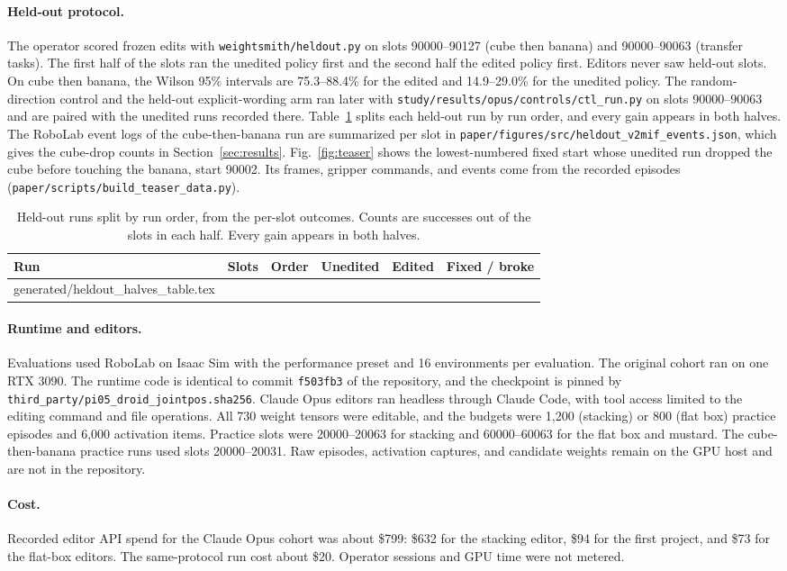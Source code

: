 \documentclass{article}
\makeatletter
\newcommand{\tabinput}[1]{\@@input #1 }
\makeatother
\begin{document}
\paragraph{Held-out protocol.} The operator scored frozen edits with \texttt{weightsmith/heldout.py} on slots 90000--90127 (cube then banana) and 90000--90063 (transfer tasks). The first half of the slots ran the unedited policy first and the second half the edited policy first. Editors never saw held-out slots. On cube then banana, the Wilson 95\% intervals are 75.3--88.4\% for the edited and 14.9--29.0\% for the unedited policy. The random-direction control and the held-out explicit-wording arm ran later with \texttt{study/results/opus/controls/ctl\_run.py} on slots 90000--90063 and are paired with the unedited runs recorded there. Table~\ref{tab:halves} splits each held-out run by run order, and every gain appears in both halves. The RoboLab event logs of the cube-then-banana run are summarized per slot in \texttt{paper/figures/src/heldout\_v2mif\_events.json}, which gives the cube-drop counts in Section~\ref{sec:results}. Fig.~\ref{fig:teaser} shows the lowest-numbered fixed start whose unedited run dropped the cube before touching the banana, start 90002. Its frames, gripper commands, and events come from the recorded episodes (\texttt{paper/scripts/build\_teaser\_data.py}).

\begin{table}[htbp]
\centering\small
\caption{Held-out runs split by run order, from the per-slot outcomes. Counts are successes out of the slots in each half. Every gain appears in both halves.}
\label{tab:halves}
\begin{tabular}{@{}llllll@{}}
\toprule
Run & Slots & Order & Unedited & Edited & Fixed / broke\\
\midrule
\tabinput{generated/heldout_halves_table.tex}
\bottomrule
\end{tabular}
\end{table}

\paragraph{Runtime and editors.} Evaluations used RoboLab on Isaac Sim with the performance preset and 16 environments per evaluation. The original cohort ran on one RTX 3090. The runtime code is identical to commit \texttt{f503fb3} of the repository, and the checkpoint is pinned by \texttt{third\_party/pi05\_droid\_jointpos.sha256}. Claude Opus editors ran headless through Claude Code, with tool access limited to the editing command and file operations. All 730 weight tensors were editable, and the budgets were 1,200 (stacking) or 800 (flat box) practice episodes and 6,000 activation items. Practice slots were 20000--20063 for stacking and 60000--60063 for the flat box and mustard. The cube-then-banana practice runs used slots 20000--20031. Raw episodes, activation captures, and candidate weights remain on the GPU host and are not in the repository.

\paragraph{Cost.} Recorded editor API spend for the Claude Opus cohort was about \$799: \$632 for the stacking editor, \$94 for the first project, and \$73 for the flat-box editors. The same-protocol run cost about \$20. Operator sessions and GPU time were not metered.
\end{document}
